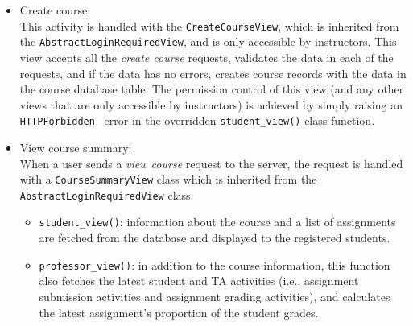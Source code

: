 \begin{itemize}
    \label{item:NEW_COURSE}
    \item Create course: \\
        This activity is handled with the \texttt{CreateCourseView}, which is
        inherited from the \texttt{AbstractLoginRequiredView}, and is
        only accessible by instructors. 
        This view accepts all the \emph{create course} requests, validates the
        data in each of the requests, and if the data has no errors,
        creates course records with the data in the course database table.
        The permission control of this view
        (and any other views that are only accessible by instructors) is
        achieved by simply raising an \texttt{HTTPForbidden}~\citep[Section 6.5.3]{http}
        error in the overridden \texttt{student\_view()} class function.
    
    \item View course summary:\\
    When a user sends a \emph{view course} request to the server, the request
    is handled with a \texttt{CourseSummaryView} class which is inherited from
    the \texttt{AbstractLogin\-Required\-View} class.
    \begin{itemize}
        \item \texttt{student\_view()}: 
            information about the course and a list of assignments
            are fetched from the database and displayed to the registered
            students.
        \item \texttt{professor\_view()}:
            in addition to the course information,
            this function also fetches the latest student and TA activities 
            (i.e., assignment submission activities and  assignment grading
            activities),
            and calculates the latest assignment's proportion of the student
            grades.
    \end{itemize}
\end{itemize}

